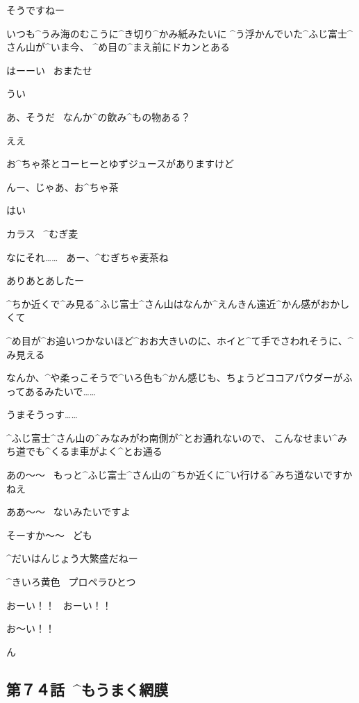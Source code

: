 \Alpha そうですねー

\page[108]
\Alpha いつも^{うみ}{海}のむこうに^{き}{切}り^{かみ}{紙}みたいに
^{う}{浮}かんでいた^{ふじ}{富士}^{さん}{山}が^{いま}{今}、
^{め}{目}の^{まえ}{前}にドカンとある

\Alpha はーーい
\ おまたせ

\Person うい

\Person あ、そうだ
\ なんか^{の}{飲}み^{もの}{物}ある？

\Alpha ええ

\page
\Alpha お^{ちゃ}{茶}とコーヒーとゆずジュースがありますけど

\Person んー、じゃあ、お^{ちゃ}{茶}

\Alpha はい

\Sign カラス
\ ^{むぎ}{麦}

\Person なにそれ……
\ あー、^{むぎちゃ}{麦茶}ね

\Alpha ありあとあしたー

\page
\Alpha ^{ちか}{近}くで^{み}{見}る^{ふじ}{富士}^{さん}{山}はなんか^{えんきん}{遠近}^{かん}{感}がおかしくて

\Alpha ^{め}{目}が^{お}{追}いつかないほど^{おお}{大}きいのに、ホイと^{て}{手}でさわれそうに、^{み}{見}える

\Alpha なんか、^{や}{柔}っこそうで^{いろ}{色}も^{かん}{感}じも、ちょうどココアパウダーがふってあるみたいで……

\Alpha うまそうっす……

\page
\Alpha ^{ふじ}{富士}^{さん}{山}の^{みなみがわ}{南側}が^{とお}{通}れないので、
こんなせまい^{みち}{道}でも^{くるま}{車}がよく^{とお}{通}る

\Person あの〜〜
\ もっと^{ふじ}{富士}^{さん}{山}の^{ちか}{近}くに^{い}{行}ける^{みち}{道}ないですかねえ

\Alpha ああ〜〜
\ ないみたいですよ

\Person そーすか〜〜
\ ども

\Alpha ^{だいはんじょう}{大繁盛}だねー

\page[113]
\Alpha ^{きいろ}{黄色}
\ プロペラひとつ

\Alpha おーい！！
\ おーい！！

\page
\Alpha お〜い！！

\page[118]
\Alpha ん


\subsection{第７４話\ ^{もうまく}{網膜}}

